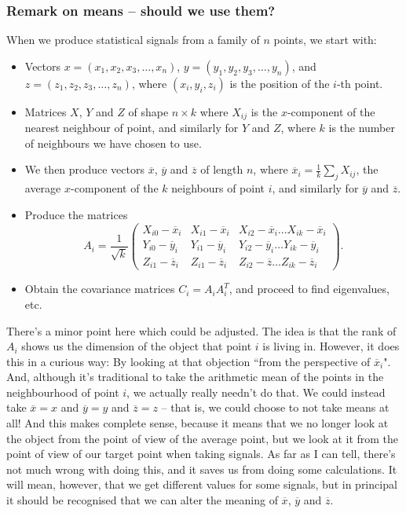 \documentclass[a4paper,11pt,twoside]{article}
\theoremstyle{definition}
\theoremstyle{remark}
\begin{document}
\subsubsection{Remark on means -- should we use them?}
When we produce statistical signals from a family of $n$ points, we start with:
\begin{itemize}
\item Vectors $x=(x_1,x_2,x_3,\dots,x_n)$, $y=(y_1,y_2,y_3,\dots,y_n)$, and $z=(z_1,z_2,z_3,\dots,z_n)$, where $(x_i,y_i,z_i)$ is the position of the $i$-th point.
\item Matrices $X$, $Y$ and $Z$ of shape $n\times k$ where $X_{ij}$ is the $x$-component of the nearest neighbour of point, and similarly for $Y$ and $Z$, where $k$ is the number of neighbours we have chosen to use.
\item We then produce vectors $\overline x$, $\overline y$ and $\overline z$ of length $n$, where $\overline x_i=\frac{1}{k}\sum_{j}X_{ij}$, the average $x$-component of the $k$ neighbours of point $i$, and similarly for $\overline y$ and $\overline z$.
\item Produce the matrices
\begin{displaymath}
A_i=\frac{1}{\sqrt{k}}
\begin{pmatrix}
X_{i0}-\overline x_i& X_{i1}-\overline x_i&X_{i2}-\overline x_i\dots X_{ik}-\overline x_i\\
Y_{i0}-\overline y_i& Y_{i1}-\overline y_i&Y_{i2}-\overline y_i\dots Y_{ik}-\overline y_i\\
Z_{i1}-\overline z_i& Z_{i1}-\overline z_i&Z_{i2}-\overline z\dots Z_{ik}-\overline z_i
\end{pmatrix}.
\end{displaymath}
\item Obtain the covariance matrices $C_i=A_iA_i^T$, and proceed to find eigenvalues, etc.
\end{itemize}
There's a minor point here which could be adjusted. The idea is that the rank of $A_i$ shows us the dimension of the object that point $i$ is living in. However, it does this in a curious way: By looking at that objection ``from the perspective of $\overline x_i$". And, although it's traditional to take the arithmetic mean of the points in the neighbourhood of point $i$, we actually really needn't do that. We could instead take $\overline x = x$ and $\overline y=y$ and $\overline z = z$ -- that is, we could choose to not take means at all! And this makes complete sense, because it means that we no longer look at the object from the point of view of the average point, but we look at it from the point of view of our target point when taking signals. As far as I can tell, there's not much wrong with doing this, and it saves us from doing some calculations. It will mean, however, that we get different values for some signals, but in principal it should be recognised that we can alter the meaning of $\overline x$, $\overline y$ and $\overline z$. 
\end{document}
